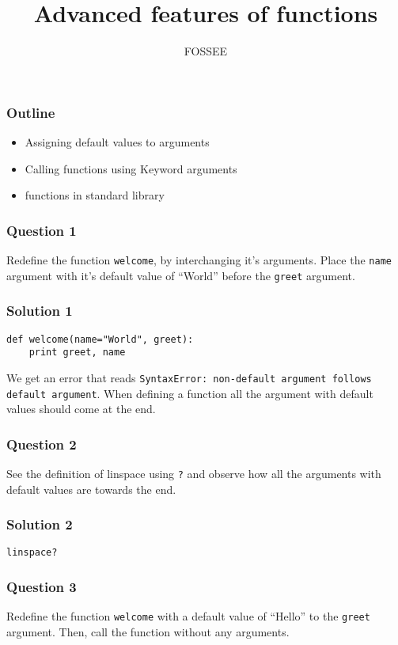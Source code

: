 \documentclass[presentation]{beamer}
\title{Advanced features of functions}
\author{FOSSEE}
\date{}
\begin{document}
\maketitle









\begin{frame}
\frametitle{Outline}
\label{sec-1}

\begin{itemize}
\item Assigning default values to arguments
\item Calling functions using Keyword arguments
\item functions in standard library
\end{itemize}
\end{frame}
\begin{frame}
\frametitle{Question 1}
\label{sec-2}

  Redefine the function \texttt{welcome}, by interchanging it's
  arguments. Place the \texttt{name} argument with it's default value of
  ``World'' before the \texttt{greet} argument.
\end{frame}
\begin{frame}[fragile]
\frametitle{Solution 1}
\label{sec-3}

\begin{verbatim}
def welcome(name="World", greet):
    print greet, name
\end{verbatim}
  We get an error that reads \texttt{SyntaxError: non-default argument   follows default argument}. When defining a function all the
  argument with default values should come at the end.
\end{frame}
\begin{frame}
\frametitle{Question 2}
\label{sec-4}

  See the definition of linspace using \texttt{?} and observe how all the
  arguments with default values are towards the end.
\end{frame}
\begin{frame}[fragile]
\frametitle{Solution 2}
\label{sec-5}

\begin{verbatim}
linspace?
\end{verbatim}
\end{frame}
\begin{frame}
\frametitle{Question 3}
\label{sec-6}

  Redefine the function \texttt{welcome} with a default value of
  ``Hello'' to the \texttt{greet} argument. Then, call the function without any
  arguments. 
\end{frame}
\end{document}
